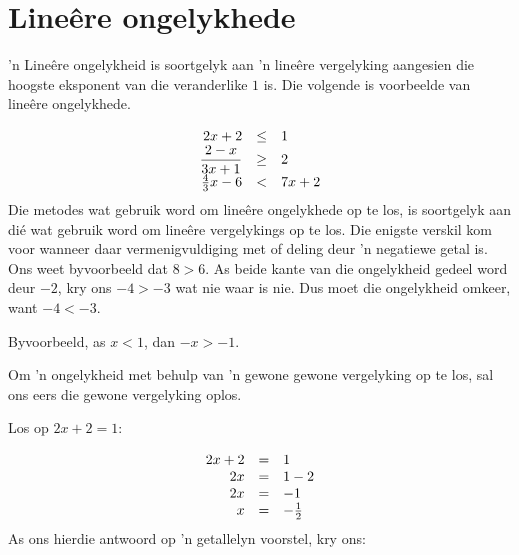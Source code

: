 \section{Lineêre ongelykhede}
\nopagebreak






’n Lineêre ongelykheid is soortgelyk aan ’n lineêre vergelyking aangesien die hoogste eksponent van die veranderlike $1$ is. Die volgende is voorbeelde van lineêre ongelykhede.\par 

\begin{equation*}
\begin{array}{ccc}\hfill 2x+2& \leq& 1\hfill \\ \hfill \dfrac{2-x}{3x+1}&\geq& 2\hfill \\ \hfill \frac{4}{3}x-6&<& 7x+2\hfill \end{array}
\end{equation*}
Die metodes wat gebruik word om lineêre ongelykhede op te los, is soortgelyk aan dié wat gebruik word om
lineêre vergelykings op te los. Die enigste verskil kom voor wanneer daar vermenigvuldiging met of deling deur ’n negatiewe getal is. Ons weet byvoorbeeld dat
$8>6$. As beide kante van die ongelykheid gedeel word deur $-2$, kry ons $-4 > -3$ wat nie waar is nie. Dus moet die ongelykheid omkeer, want $-4<-3$.



Byvoorbeeld, as  $x<1$, dan $-x>-1$.\par
Om ’n ongelykheid met behulp van 'n gewone gewone vergelyking op te los, sal ons eers die gewone vergelyking oplos.\par
 Los op $2x+2=1$:

\begin{equation*}
\begin{array}{ccl}\hfill 2x+2& =& 1\hfill \\ \hfill 2x& =& 1-2\hfill \\ \hfill 2x& =& -1\hfill \\ \hfill x& =& -\frac{1}{2}\hfill \end{array}
\end{equation*}
As ons hierdie antwoord op ’n getallelyn voorstel, kry ons:\par 

